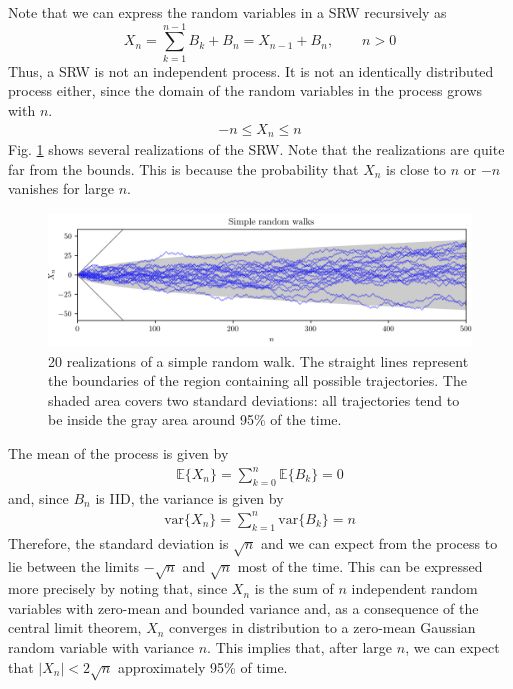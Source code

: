 Note that we can express the random variables in a SRW recursively as
 \begin{equation}
X_n = \sum_{k=1}^{n-1} B_k + B_n = X_{n-1} + B_n,    \qquad  n>0
\label{sp:srw_rec}
\end{equation}
Thus, a SRW is not an independent process. It is not an identically distributed process either, since the domain of the random variables in the process grows with $n$. 
\begin{align}
-n \le X_n \le n
\end{align}
Fig. \ref{fig:sp_srw} shows several realizations of the SRW. Note that the realizations are quite far from the bounds. This is because the probability that $X_n$ is close to $n$ or $-n$ vanishes for large $n$.
\begin{figure}[htb]
\begin{center}
\includegraphics[width=14cm]{Figures//sp_random_walk_1d.png} 
\caption{20 realizations of a simple random walk. The straight lines represent the boundaries of the region containing all possible trajectories. The shaded area covers two standard deviations: all trajectories tend to be inside the gray area around 95\% of the time.}
\label{fig:sp_srw}
\end{center}
\end{figure}

The mean of the process is given by
\begin{align}
\mathbb{E}\{X_n\} = \sum_{k=0}^n \mathbb{E}\{B_k\} = 0
\end{align}
and, since $B_n$ is IID, the variance is given by
\begin{align}
\text{var}\{X_n\} = \sum_{k=1}^n \text{var}\{B_k\} = n
\end{align}
Therefore, the standard deviation is $\sqrt{n}$ and we can expect from the process to lie between the limits $-\sqrt{n}$ and $\sqrt{n}$ most of the time. This can be expressed more precisely by noting that, since $X_n$ is the sum of $n$ independent random variables with zero-mean and bounded variance and, as a consequence of the central limit theorem, $X_n$ converges in distribution to a zero-mean Gaussian random variable with variance $n$. This implies that, after large $n$, we can expect that $|X_n| < 2\sqrt{n}$ approximately 95\% of time.

